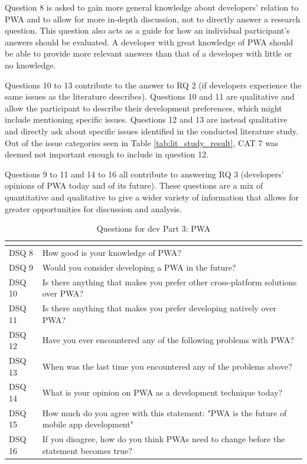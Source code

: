 \documentclass[a4paper,12pt]{article}
\begin{document}
Question 8 is asked to gain more general knowledge about developers’ relation to PWA and to allow for more in-depth discussion, not to directly answer a research question.  This question also acts as a guide for how an individual participant’s answers should be evaluated. A developer with great knowledge of PWA should be able to provide more relevant answers than that of a developer with little or no knowledge.

Questions 10 to 13 contribute to the answer to RQ 2 (if developers experience the same issues as the literature describes). Questions 10 and 11 are qualitative and allow the participant to describe their development preferences, which might include mentioning specific issues. Questions 12 and 13 are instead qualitative and directly ask about specific issues identified in the conducted literature study. Out of the issue categories seen in Table \ref{tab:lit_study_result}, CAT 7 was deemed not important enough to include in question 12.

Questions 9 to 11 and 14 to 16 all contribute to answering RQ 3 (developers’ opinions of PWA today and of its future). These questions are a mix of quantitative and qualitative to give a wider variety of information that allows for greater opportunities for discussion and analysis.

\begin{table}[h]
\centering
{}
\begin{tabular}{|l|p{11cm}|}
\hline
\rowcolor[HTML]{656565}
\multicolumn{1}{|c|}{\cellcolor[HTML]{656565}{\color[HTML]{FFFFFF} Number}} & \multicolumn{1}{l|}{\cellcolor[HTML]{656565}{\color[HTML]{FFFFFF} Question}} \\ \hline
DSQ 8 & How good is your knowledge of PWA? \\
DSQ 9 & Would you consider developing a PWA in the future? \\
DSQ 10 & Is there anything that makes you prefer other cross-platform solutions over PWA? \\
DSQ 11 & Is there anything that makes you prefer developing natively over PWA? \\
DSQ 12 & Have you ever encountered any of the following problems with PWA? \\
DSQ 13 & When was the last time you encountered any of the problems above? \\
DSQ 14 & What is your opinion on PWA as a development technique today? \\
DSQ 15 & How much do you agree with this statement: "PWA is the future of mobile app development" \\
DSQ 16 & If you disagree, how do you think PWAs need to change before the statement becomes true? \\
\hline
\end{tabular}
\caption{Questions for dev Part 3: PWA}
\label{tab:devq3}
\end{table}
\end{document}
